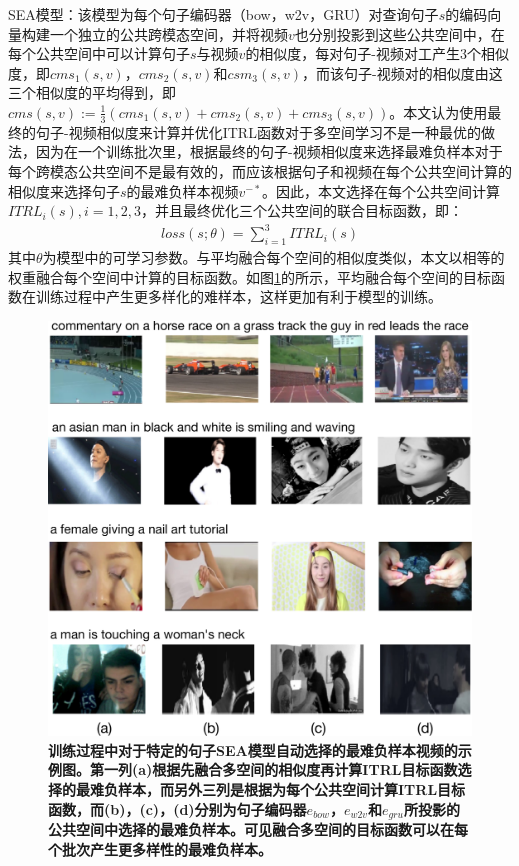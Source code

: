 SEA模型：该模型为每个句子编码器（bow，w2v，GRU）对查询句子$s$的编码向量构建一个独立的公共跨模态空间，并将视频$v$也分别投影到这些公共空间中，在每个公共空间中可以计算句子$s$与视频$v$的相似度，每对句子-视频对工产生3个相似度，即$cms_1(s,v)$，$cms_2(s,v)$和$csm_3(s,v)$，而该句子-视频对的相似度由这三个相似度的平均得到，即$cms(s,v):=\frac{1}{3}(cms_1(s,v)+cms_2(s,v)+cms_3(s,v))$。本文认为使用最终的句子-视频相似度来计算并优化ITRL函数对于多空间学习不是一种最优的做法，因为在一个训练批次里，根据最终的句子-视频相似度来选择最难负样本对于每个跨模态公共空间不是最有效的，而应该根据句子和视频在每个公共空间计算的相似度来选择句子$s$的最难负样本视频$v^{-*}$。因此，本文选择在每个公共空间计算$ITRL_i(s), i=1,2,3$，并且最终优化三个公共空间的联合目标函数，即：
\begin{equation}
    \label{eq:loss-sea}
    \begin{aligned}
        loss(s;\theta) = \sum_{i=1}^3 ITRL_i(s)
    \end{aligned}
\end{equation}
其中$\theta$为模型中的可学习参数。与平均融合每个空间的相似度类似，本文以相等的权重融合每个空间中计算的目标函数。如图\ref{fig:negative-examples}的所示，平均融合每个空间的目标函数在训练过程中产生更多样化的难样本，这样更加有利于模型的训练。

\begin{figure}[tbh!]
    \centering
    \includegraphics[width=\linewidth]{figures/single_vs_combined_loss}
    \caption[训练过程中对于特定的句子SEA模型自动选择的最难负样本视频的示例图]{\bfseries{训练过程中对于特定的句子SEA模型自动选择的最难负样本视频的示例图。第一列(a)根据先融合多空间的相似度再计算ITRL目标函数选择的最难负样本，而另外三列是根据为每个公共空间计算ITRL目标函数，而(b)，(c)，(d)分别为句子编码器$e_{bow}$，$e_{w2v}$和$e_{gru}$所投影的公共空间中选择的最难负样本。可见融合多空间的目标函数可以在每个批次产生更多样性的最难负样本。}}
    \label{fig:negative-examples}
\end{figure}

